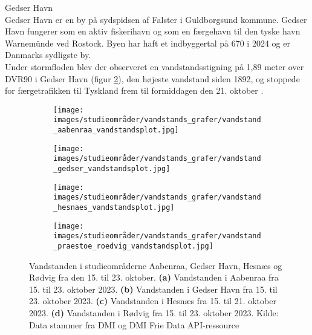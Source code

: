 {\large Gedser Havn}\\
Gedser Havn er en by på sydspidsen af Falster i Guldborgsund kommune. Gedser Havn fungerer som en aktiv fiskerihavn og som en færgehavn til den tyske havn Warnemünde ved Rostock. Byen har haft et indbyggertal på 670 i 2024 \citep{danmarks_statistisk_mobile_nodate} og er Danmarks sydligste by. \\
Under stormfloden blev der observeret en vandstandsstigning på 1,89 meter over DVR90 i Gedser Havn (figur \ref{Subfig: Gedser vandstand}), den højeste vandstand siden 1892, og stoppede for færgetrafikken til Tyskland frem til formiddagen den 21. oktober \citep{tiirikainen_sadan_2023}. \\
\begin{figure}[H]
    \begin{subfigure}[b]{0.5\textwidth}
        \centering
        \texttt{[image: images/studieområder/vandstands\_grafer/vandstand\_aabenraa\_vandstandsplot.jpg]}
        \caption{}
        \label{Subfig: Aabenraa vandstand}
    \end{subfigure}
    \hspace{0.2cm}
    \begin{subfigure}[b]{0.5\textwidth}
        \centering
        \texttt{[image: images/studieområder/vandstands\_grafer/vandstand\_gedser\_vandstandsplot.jpg]}
        \caption{}
        \label{Subfig: Gedser vandstand}
    \end{subfigure}
    \vspace{0.2cm}
    \begin{subfigure}[b]{0.5\textwidth}
        \centering
        \texttt{[image: images/studieområder/vandstands\_grafer/vandstand\_hesnaes\_vandstandsplot.jpg]}
        \caption{}
        \label{Subfig: Hesnæs vandstand}
    \end{subfigure}
    \hspace{0.2cm}
    \begin{subfigure}[b]{0.5\textwidth}
        \centering
        \texttt{[image: images/studieområder/vandstands\_grafer/vandstand\_praestoe\_roedvig\_vandstandsplot.jpg]}
        \caption{}
        \label{Subfig: Rødvig vandstand}
    \end{subfigure}
    \caption{Vandstanden i studieområderne Aabenraa, Gedser Havn, Hesnæs og Rødvig fra den 15. til 23. oktober. \textbf{(a)} Vandstanden i Aabenraa fra 15. til 23. oktober 2023. \textbf{(b)} Vandstanden i Gedser Havn fra 15. til 23. oktober 2023. \textbf{(c)} Vandstanden i Hesnæs fra 15. til 21. oktober 2023. \textbf{(d)} Vandstanden i Rødvig fra 15. til 23. oktober 2023. Kilde: Data stammer fra DMI og DMI Frie Data API-ressource}
    \label{Figur: Vandstandsdata}
\end{figure}
